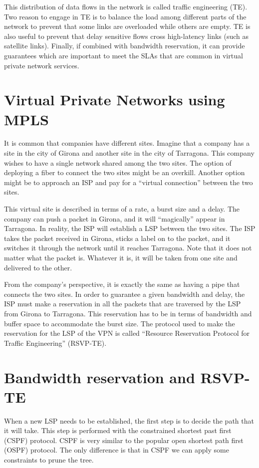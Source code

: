 This distribution of data flows in the network is called traffic engineering (TE).
Two reason to engage in TE is to balance the load among different parts of the network to prevent that some links are overloaded while others are empty.
TE is also useful to prevent that delay sensitive flows cross high-latency links (such as satellite links).
Finally, if combined with bandwidth reservation, it can provide guarantees which are important to meet the SLAs that are common in virtual private network services.

\section{Virtual Private Networks using MPLS}
It is common that companies have different sites.
Imagine that a company has a site in the city of Girona and another site in the city of Tarragona.
This company wishes to have a single network shared among the two sites.
The option of deploying a fiber to connect the two sites might be an overkill.
Another option might be to approach an ISP and pay for a ``virtual connection'' between the two sites.

This virtual site is described in terms of a rate, a burst size and a delay.
The company can push a packet in Girona, and it will ``magically'' appear in Tarragona.
In reality, the ISP will establish a LSP between the two sites.
The ISP takes the packet received in Girona, sticks a label on to the packet, and it switches it through the network until it reaches Tarragona.
Note that it does not matter what the packet is.
Whatever it is, it will be taken from one site and delivered to the other.

From the company's perspective, it is exactly the same as having a pipe that connects the two sites.
In order to guarantee a given bandwidth and delay, the ISP must make a reservation in all the packets that are traversed by the LSP from Girona to Tarragona.
This reservation has to be in terms of bandwidth and buffer space to accommodate the burst size.
The protocol used to make the reservation for the LSP of the VPN is called ``Resource Reservation Protocol for Traffic Engineering'' (RSVP-TE).


\section{Bandwidth reservation and RSVP-TE}
When a new LSP needs to be established, the first step is to decide the path that it will take.
This step is performed with the constrained shortest past first (CSPF) protocol.
CSPF is very similar to the popular open shortest path first (OSPF) protocol.
The only difference is that in CSPF we can apply some constraints to prune the tree.


